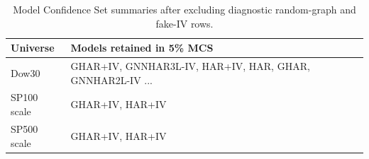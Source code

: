 \begin{table}[H]
\centering
\small
\begin{tabular}{ll}
\toprule
Universe & Models retained in 5\% MCS \\
\midrule
Dow30 & GHAR+IV, GNNHAR3L-IV, HAR+IV, HAR, GHAR, GNNHAR2L-IV ... \\
SP100 scale & GHAR+IV, HAR+IV \\
SP500 scale & GHAR+IV, HAR+IV \\
\bottomrule
\end{tabular}
\caption{Model Confidence Set summaries after excluding diagnostic random-graph and fake-IV rows.}
\label{tab:mcs-summary}
\end{table}

